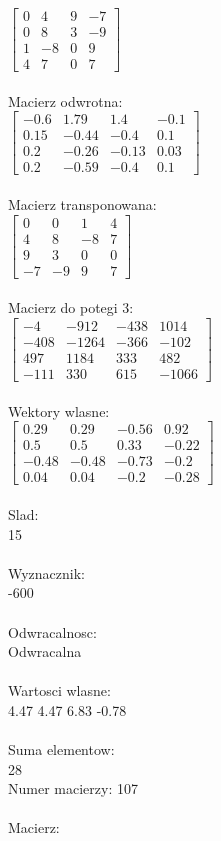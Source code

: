 \documentclass[a4paper,12pt]{article}
\begin{document}
$\begin{bmatrix} 0&4&9&-7\\0&8&3&-9\\1&-8&0&9\\4&7&0&7 \end{bmatrix}$
\\
\\
Macierz odwrotna:\\

$\begin{bmatrix} -0.6&1.79&1.4&-0.1\\0.15&-0.44&-0.4&0.1\\0.2&-0.26&-0.13&0.03\\0.2&-0.59&-0.4&0.1 \end{bmatrix}$
\\
\\
Macierz transponowana:\\

$\begin{bmatrix} 0&0&1&4\\4&8&-8&7\\9&3&0&0\\-7&-9&9&7 \end{bmatrix}$
\\
\\
Macierz do potegi 3:\\

$\begin{bmatrix} -4&-912&-438&1014\\-408&-1264&-366&-102\\497&1184&333&482\\-111&330&615&-1066 \end{bmatrix}$
\\
\\
Wektory wlasne:\\

$\begin{bmatrix} 0.29&0.29&-0.56&0.92\\0.5&0.5&0.33&-0.22\\-0.48&-0.48&-0.73&-0.2\\0.04&0.04&-0.2&-0.28 \end{bmatrix}$
\\
\\
Slad:\\
15
\\
\\
Wyznacznik:\\
-600
\\
\\
Odwracalnosc:\\
Odwracalna
\\
\\
Wartosci wlasne:\\
4.47 4.47 6.83 -0.78
\\
\\
Suma elementow:\\
28
\\
\newpage
Numer macierzy:
107
\\
\\
Macierz:\\
\end{document}
